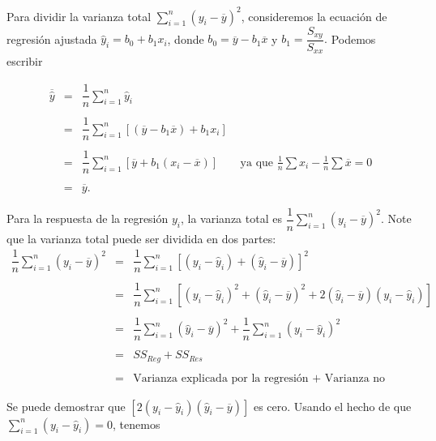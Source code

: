 Para dividir la varianza total $\sum\limits_{i=1}^n\left(y_i-\overline{y}\right)^2$, consideremos la ecuación de regresión ajustada $\hat{y}_i=b_0+b_1x_i$, donde $b_0=\overline{y}-b_1\overline{x}$ y $b_1=\dfrac{S_{xy}}{S_{xx}}.$ Podemos escribir

$$
\begin{array}{rcll}
    \overline{\hat{y}}&=&\dfrac{1}{n}\displaystyle\sum_{i=1}^n\hat{y}_i&\\\\
		      &=&\dfrac{1}{n}\displaystyle\sum_{i=1}^n\left[\left(\overline{y}-b_1\overline{x}\right)+b_1x_i\right]&\\\\
		      &=&\dfrac{1}{n}\displaystyle\sum_{i=1}^n\left[\overline{y}+b_1\left(x_i-\overline{x}\right)\right]& \mbox{ ya que } \frac{1}{n}\sum\limits x_i-\frac{1}{n}\sum\limits \overline{x}=0\\\\
		      &=&\overline{y}.&
\end{array}
$$

Para la respuesta de la regresión $y_i$, la varianza total es $\dfrac{1}{n}\sum\limits_{i=1}^n\left(y_i-\overline{y}\right)^2$. Note que la varianza total puede ser dividida en dos partes:
$$
\begin{array}{rcl}
    \dfrac{1}{n}\displaystyle\sum_{i=1}^n \left(y_i-\overline{y}\right)^2 &=& \dfrac{1}{n}\displaystyle\sum_{i=1}^n \left[\left(y_i-\hat{y}_i\right)+\left(\hat{y}_i-\overline{y}\right)\right]^2\\\\
									  &=& \dfrac{1}{n}\displaystyle\sum_{i=1}^n \left[\left(y_i-\hat{y}_i\right)^2+\left(\hat{y}_i-\overline{y}\right)^2+2\left(\hat{y}_i-\overline{y}\right)\left(y_i-\hat{y}_i\right)\right]\\\\
									  &=& \dfrac{1}{n}\displaystyle\sum_{i=1}^n \left(\hat{y}_i-\overline{y}\right)^2 + \dfrac{1}{n}\displaystyle\sum_{i=1}^n \left(y_i-\hat{y}_i\right)^2\\\\
									  &=&SS_{Reg} + SS_{Res}\\\\
									  &=& \mbox{Varianza explicada por la regresión + Varianza no explicada (del residuo).}
\end{array}
$$

Se puede demostrar que $\left[2\left(y_i-\hat{y}_i\right)\left(\hat{y}_i-\overline{y}\right)\right]$ es cero. Usando el hecho de que $\sum\limits_{i=1}^n\left(y_i-\hat{y}_i\right)=0$, tenemos

